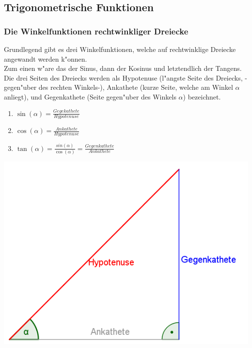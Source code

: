 \subsection{Trigonometrische Funktionen}
\subsubsection{Die Winkelfunktionen rechtwinkliger Dreiecke}
Grundlegend gibt es drei Winkelfunktionen, welche auf rechtwinklige Dreiecke angewandt werden k"onnen.\\
Zum einen w"are das der Sinus, dann der Kosinus und letztendlich der Tangens.\\
Die drei Seiten des Dreiecks werden als Hypotenuse (l"angste Seite des Dreiecks, -gegen"uber des rechten Winkels-), Ankathete (kurze Seite, welche am Winkel $\alpha$ anliegt), und Gegenkathete (Seite gegen"uber des Winkels $\alpha$) bezeichnet.
\begin{minipage}{7 cm}
\begin{enumerate}
\item $\sin(\alpha)=\frac{Gegekathete}{Hypotenuse}$
\item $\cos(\alpha)=\frac{Ankathete}{Hypotenuse}$
\item $\tan(\alpha)=\frac{sin(\alpha)}{\cos(\alpha)}= \frac{Gegenkathete}{Ankathete}$
\end{enumerate}
\end{minipage}
\begin{minipage}{6 cm}
\includegraphics[width = 6 cm]{pictures/TrigonDreieck}
\end{minipage}

